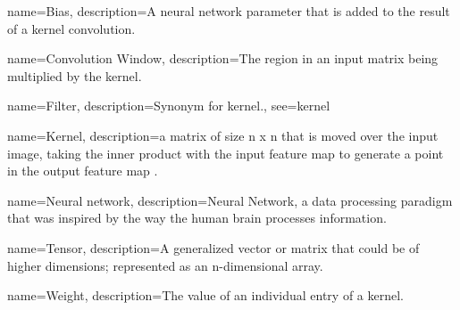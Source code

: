 




{
    name=Bias,
    description={A neural network parameter that is added to the result of a kernel convolution.}
}

{
    name=Convolution Window,
    description={The region in an input matrix being multiplied by the kernel.}
}

{
    name=Filter,
    description={Synonym for kernel.},
    see={kernel}
}

{
    name=Kernel,
    description={a matrix of size n x n that is moved over the input image, taking the inner product with the input feature map to generate a point in the output feature map .}
}

{
    name=Neural network,
    description={Neural Network, a data processing paradigm that was inspired by the way the human brain processes information.}
}

{
    name=Tensor,
    description={A generalized vector or matrix that could be of higher dimensions; represented as an n-dimensional array.}
}

{
    name=Weight,
    description={The value of an individual entry of a kernel.}
}
